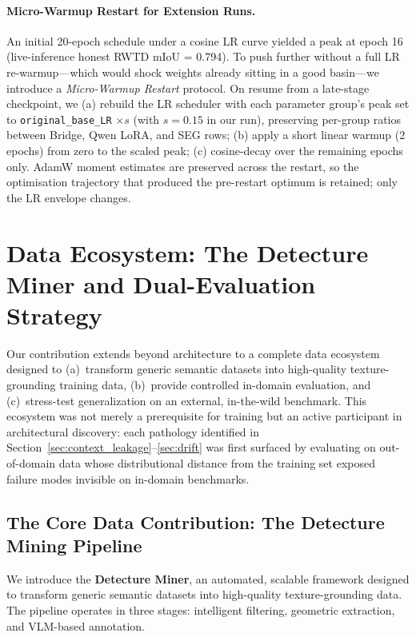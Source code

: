 \documentclass{article}
\begin{document}
\paragraph{Micro-Warmup Restart for Extension Runs.}
An initial 20-epoch schedule under a cosine LR curve yielded a peak at epoch 16 (live-inference honest RWTD mIoU = 0.794). To push further without a full LR re-warmup---which would shock weights already sitting in a good basin---we introduce a \emph{Micro-Warmup Restart} protocol. On resume from a late-stage checkpoint, we (a) rebuild the LR scheduler with each parameter group's peak set to \texttt{original\_base\_LR} $\times s$ (with $s = 0.15$ in our run), preserving per-group ratios between Bridge, Qwen LoRA, and SEG rows; (b) apply a short linear warmup (2 epochs) from zero to the scaled peak; (c) cosine-decay over the remaining epochs only. AdamW moment estimates are preserved across the restart, so the optimisation trajectory that produced the pre-restart optimum is retained; only the LR envelope changes.

\section{Data Ecosystem: The Detecture Miner and Dual-Evaluation Strategy}
\label{sec:data}

Our contribution extends beyond architecture to a complete data ecosystem designed to (a)~transform generic semantic datasets into high-quality texture-grounding training data, (b)~provide controlled in-domain evaluation, and (c)~stress-test generalization on an external, in-the-wild benchmark. This ecosystem was not merely a prerequisite for training but an active participant in architectural discovery: each pathology identified in Section~\ref{sec:context_leakage}--\ref{sec:drift} was first surfaced by evaluating on out-of-domain data whose distributional distance from the training set exposed failure modes invisible on in-domain benchmarks.

\subsection{The Core Data Contribution: The Detecture Mining Pipeline}
\label{sec:pipeline}

We introduce the \textbf{Detecture Miner}, an automated, scalable framework designed to transform generic semantic datasets into high-quality texture-grounding data. The pipeline operates in three stages: intelligent filtering, geometric extraction, and VLM-based annotation.
\end{document}
